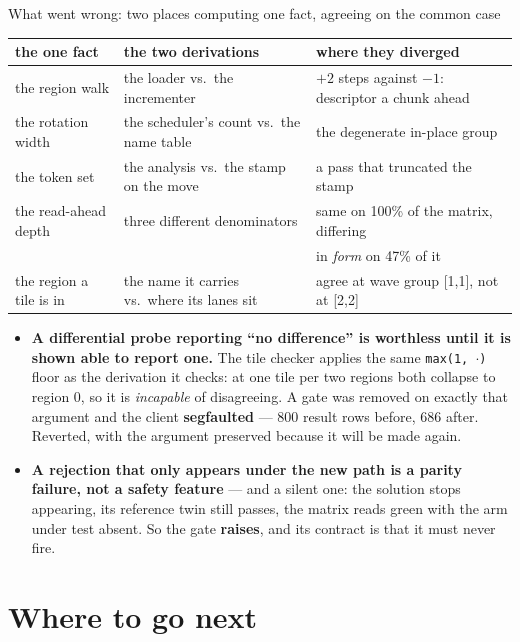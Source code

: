 \documentclass[aspectratio=169,9pt]{beamer}
\newcommand{\key}[1]{\textcolor{acc}{\textbf{#1}}}
\newcommand{\bad}[1]{\textcolor{warn}{\textbf{#1}}}
\begin{document}
\begin{frame}{What went wrong: two places computing one fact, agreeing on the common case}
\begin{center}
{\scriptsize\setlength{\tabcolsep}{4pt}
\begin{tabular}{lll}
\toprule
\textbf{the one fact} & \textbf{the two derivations} & \textbf{where they diverged} \\
\midrule
the region walk & the loader vs.\ the incrementer & $+2$ steps against $-1$: descriptor a chunk ahead \\
the rotation width & the scheduler's count vs.\ the name table & the degenerate in-place group \\
the token set & the analysis vs.\ the stamp on the move & a pass that truncated the stamp \\
the read-ahead depth & three different denominators & same on 100\% of the matrix, differing \\
 & & in \emph{form} on 47\% of it \\
the region a tile is in & the name it carries vs.\ where its lanes sit & agree at wave group [1,1], not at [2,2] \\
\bottomrule
\end{tabular}}
\end{center}
\vspace{1mm}
\begin{itemize}
\item \bad{A differential probe reporting ``no difference'' is worthless until it is shown able to
      report one.} The tile checker applies the same \texttt{max(1,\,$\cdot$)} floor as the
      derivation it checks: at one tile per two regions both collapse to region 0, so it is
      \emph{incapable} of disagreeing. A gate was removed on exactly that argument and the client
      \bad{segfaulted} --- 800 result rows before, 686 after. Reverted, with the argument preserved
      because it will be made again.
\item \bad{A rejection that only appears under the new path is a parity failure, not a safety
      feature} --- and a silent one: the solution stops appearing, its reference twin still passes,
      the matrix reads green with the arm under test absent. So the gate \key{raises}, and its
      contract is that it must never fire.
\end{itemize}
\end{frame}

\section{Where to go next}
\end{document}
